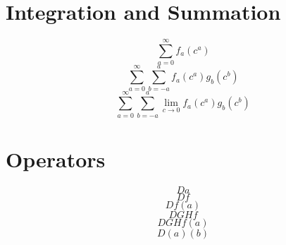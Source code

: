 \documentclass{article}
\begin{document}
\section{Integration and Summation}
\[ \sum_{a=0}^\infty f_a(c^a) \]
\[ \sum_{a=0}^\infty \sum_{b=-a}^a f_a(c^a) g_b(c^b) \]
\[ \sum_{a=0}^\infty \sum_{b=-a}^a \lim_{c\rightarrow 0} f_a(c^a) g_b(c^b) \]

\section{Operators}
\[  D a \]
\[  D f \]
\[  D f(a) \]
\[  D G H f \]
\[  D G H f (a) \]
\[  D (a) (b) \]
\end{document}
